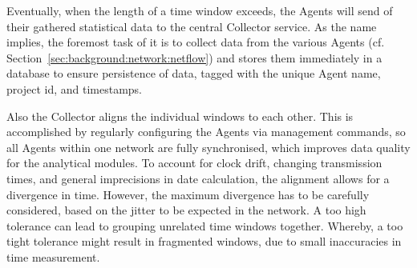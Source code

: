 Eventually, when the length of a time window exceeds, the Agents will send of their gathered statistical data to the central Collector service.
As the name implies, the foremost task of it is to collect data from the various Agents (cf. Section~\ref{sec:background:network:netflow}) and stores them immediately in a database to ensure persistence of data, tagged with the unique Agent name, project id, and timestamps.

Also the Collector aligns the individual windows to each other. This is accomplished by regularly configuring the Agents via management commands, so all Agents within one network are fully synchronised, which improves data quality for the analytical modules. To account for clock drift, changing transmission times, and general imprecisions in date calculation, the alignment allows for a divergence in time. However, the maximum divergence has to be carefully considered, based on the jitter to be expected in the network.
A too high tolerance can lead to grouping unrelated time windows together. Whereby, a too tight tolerance might result in fragmented windows, due to small inaccuracies in time measurement.

